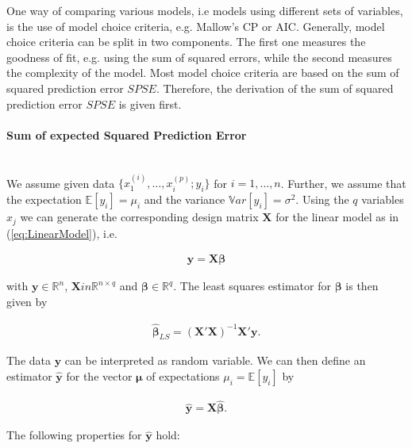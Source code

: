 \documentclass[10pt,a4paper]{article}
\newcommand{\subsubsubsection}[1]{\paragraph{#1}\mbox{}\\}
\begin{document}
One way of comparing various models, i.e models using different sets of variables, is the use of model choice criteria, e.g. Mallow's CP or AIC. Generally, model choice criteria can be split in two components. The first one measures the goodness of fit, e.g. using the sum of squared errors, while the second measures the complexity of the model. Most model choice criteria are based on the sum of squared prediction error $SPSE$. Therefore, the derivation of the sum of squared prediction error $SPSE$ is given first. 

\subsubsubsection{Sum of expected Squared Prediction Error}

We assume given data $\{ x^{(i)}_{1}, \dots, x^{(p)}_{i}; y_i\}$ for $i =1, \dots, n$. Further, we assume that the expectation $\mathbb{E}[y_i] = \mu_i$ and the variance $\mathbb{V}ar[y_i] = \sigma^2$. Using the $q$ variables $x_j$ we can generate the corresponding design matrix $\boldsymbol{X}$ for the linear model as in (\ref{eq:LinearModel}), i.e.

\begin{align}
	\boldsymbol{y} = \boldsymbol{X} \boldsymbol{\beta}
\end{align}

with $\boldsymbol{y} \in \mathbb{R}^n$, $\boldsymbol{X} in \mathbb{R}^{n \times q}$ and $\boldsymbol{\beta} \in \mathbb{R}^q$. The least squares estimator for $\boldsymbol{\beta}$ is then given by

\begin{align}
	\boldsymbol{\hat{\beta}}_{LS} = (\boldsymbol{X}'\boldsymbol{X})^{-1}\boldsymbol{X}'\boldsymbol{y}.
\end{align}

The data $\boldsymbol{y}$ can be interpreted as random variable. We can then define an estimator $\boldsymbol{\hat{y}}$ for the vector $\boldsymbol{\mu}$ of expectations $\mu_i = \mathbb{E}[y_i]$ by

\begin{align} 
	\boldsymbol{\hat{y}} = \boldsymbol{X}  \boldsymbol{\hat{\beta}}.
\end{align}

The following properties for $\boldsymbol{\hat{y}}$ hold:
\end{document}

